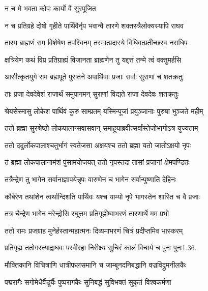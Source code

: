 \onelineshloka
{न च मे भवता कोपः कार्यो वै सुरपूजित}%


\twolineshloka
{न च प्रतिग्रहे दोषो गृहीते पार्थिवैर्नृप}
{भवान्वै तारणे शक्तस्त्रैलोक्यस्यापि राघव}%

\twolineshloka
{तारय ब्राह्मणं राम विशेषेण तपस्विनम्}
{तस्मात्प्रदास्ये विधिवत्प्रतीच्छस्व नराधिप}%


\twolineshloka
{क्षत्रियेण कथं विप्र प्रतिग्राह्यं विजानता}
{ब्राह्मणेन तु यद्दत्तं तन्मे त्वं वक्तुमर्हसि}%


\twolineshloka
{आसीत्कृतयुगे राम ब्रह्मपूते पुरातने}
{अपार्थिवाः प्रजाः सर्वाः सुराणां च शतक्रतुः}%

\twolineshloka
{ताः प्रजा देवदेवेशं राजार्थं समुपागमन्}
{सुराणां विद्यते राजा देवदेवः शतक्रतुः}%

\twolineshloka
{श्रेयसेस्मासु लोकेश पार्थिवं कुरु साम्प्रतम्}
{यस्मिन्पूजां प्रयुञ्जानाः पुरुषा भुञ्जते महीम्}%

\twolineshloka
{ततो ब्रह्मा सुरश्रेष्ठो लोकपालान्सवासवान्}
{समाहूयाब्रवीत्सर्वांस्तेजोभागोऽत्र युज्यताम्}%

\twolineshloka
{ततो ददुर्लोकपालाश्चतुर्भागं स्वतेजसा}
{अक्षयश्च ततो ब्रह्मा यतो जातोऽक्षयो नृपः}%

\twolineshloka
{तं ब्रह्मा लोकपालानामंशं पुंसामयोजयत्}
{ततो नृपस्तदा तासां प्रजानां क्षेमपण्डितः}%

\twolineshloka
{तत्रैन्द्रेण तु भागेन सर्वानाज्ञापयेन्नृपः}
{वारुणेन च भागेन सर्वान्पुष्णाति देहिनः}%

\twolineshloka
{कौबेरेण तथांशेन त्वर्थान्दिशति पार्थिवः}
{यश्च याम्यो नृपे भागस्तेन शास्ति च वै प्रजाः}%

\twolineshloka
{तत्र चैन्द्रेण भागेन नरेन्द्रोसि रघूत्तम}
{प्रतिगृह्णीष्वाभरणं तारणार्थे मम प्रभो}%

\twolineshloka
{ततो रामः प्रजग्राह मुनेर्हस्तान्महात्मनः}
{दिव्यमाभरणं चित्रं प्रदीप्तमिव भास्करम्}%

\twolineshloka
{प्रतिगृह्य ततोगस्त्याद्राघवः परवीरहा}
{निरीक्ष्य सुचिरं कालं विचार्य च पुनः पुनः1.36.}%

\twolineshloka
{मौक्तिकानि विचित्राणि धात्रीफलसमानि च}
{जाम्बूनदनिबद्धानि वज्रविद्रुमनीलकैः}%

\twolineshloka
{पद्मरागैः सगोमेधैर्वैडूर्यैः पुष्परागकैः}
{सुनिबद्धं सुविभक्तं सुकृतं विश्वकर्मणा}%

